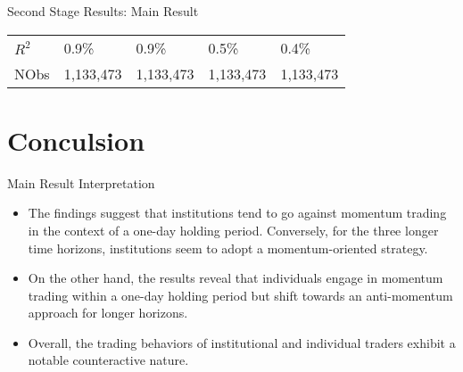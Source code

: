 \documentclass{beamer}
\begin{document}
\begin{frame}{Second Stage Results: Main Result}
{\begin{tabular}{l*{4}{l}}
            \(R^{2}\)          & 0.9\%                            & 0.9\%                           & 0.5\%     & 0.4\%     \\
            NObs               & 1,133,473                        & 1,133,473                       & 1,133,473 & 1,133,473 \\
            \bottomrule
        \end{tabular}
    }

\end{frame}

\section{Conculsion}

\begin{frame}{Main Result Interpretation}

    \begin{itemize}
        \item The findings suggest that institutions tend to go against momentum trading in the context of a one-day holding period. Conversely, for the three longer time horizons, institutions seem to adopt a momentum-oriented strategy.
        \item On the other hand, the results reveal that individuals engage in momentum trading within a one-day holding period but shift towards an anti-momentum approach for longer horizons.
        \item Overall, the trading behaviors of institutional and individual traders exhibit a notable counteractive nature.
    \end{itemize}

\end{frame}
\end{document}
